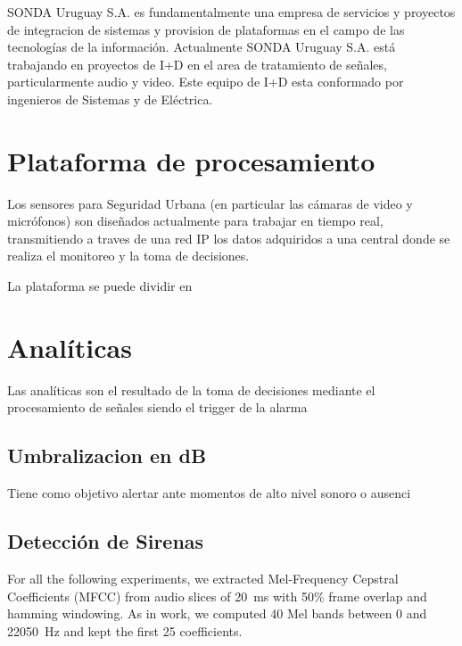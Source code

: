 \documentclass{article}
\begin{document}
SONDA Uruguay S.A. es fundamentalmente una empresa de servicios y proyectos de integracion de sistemas y provision de plataformas en el campo de las tecnologías de la información. Actualmente SONDA Uruguay S.A. está trabajando en proyectos de I+D en el area de tratamiento de señales, particularmente audio y video. Este equipo de I+D esta conformado por ingenieros de Sistemas y de Eléctrica.

 

\section{Plataforma de procesamiento}

Los sensores para Seguridad Urbana (en particular las cámaras de video y micrófonos) son diseñados actualmente para trabajar en tiempo real, transmitiendo a traves de una red IP los datos adquiridos a una central donde se realiza el monitoreo y la toma de decisiones. 

La plataforma se puede dividir en 

\section{Analíticas}

Las analíticas son el resultado de la toma de decisiones mediante el procesamiento de señales siendo el trigger de la alarma

\subsection{Umbralizacion en dB}
Tiene como objetivo alertar ante momentos de alto nivel sonoro o ausenci

\subsection{Detección de Sirenas}
For all the following experiments, we extracted Mel-Frequency Cepstral Coefficients (MFCC) from audio slices of \SI{20}{\milli\second} with 50\% frame overlap and hamming windowing. As in \cite{Salamon:UrbanSound:ACMMM:14} work, we computed 40 Mel bands between 0 and \SI{22050}{\Hz} and kept the first 25 coefficients. 


\end{document}
